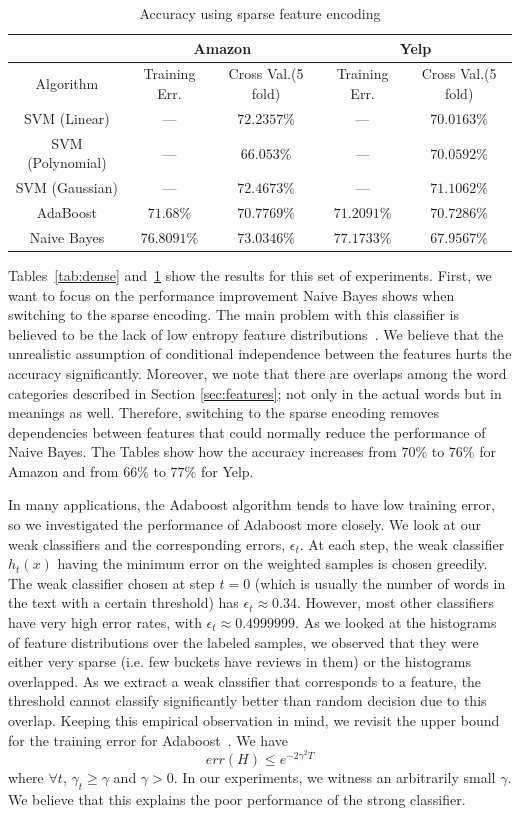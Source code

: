 \documentclass[letterpaper]{article}
\begin{document}
\begin{table}[ht]
\centering
\begin{tabular}{c | c c | c c}
 & \multicolumn{2}{|c|}{Amazon} & \multicolumn{2}{|c}{Yelp} \\
\hline
Algorithm & Training Err. & Cross Val.(5 fold) & Training Err. & Cross Val.(5 fold)\\
\hline
SVM (Linear) 		& --- & $72.2357\%$ 		& --- & $70.0163\%$\\
SVM (Polynomial) 	& --- & $66.053\%$ 		& --- & $70.0592\%$\\
SVM (Gaussian) 		& --- & $72.4673\%$ 		& --- & $71.1062\%$\\
AdaBoost 			& $71.68\%$   & $70.7769\%$ & $71.2091\%$ & $70.7286\%$\\ 
Naive Bayes 		& $76.8091\%$ & $73.0346\%$ & $77.1733\%$ & $67.9567\%$\\ 
\end{tabular}
\caption{Accuracy using sparse feature encoding}
\label{tab:sparse}
\end{table}

Tables~\ref{tab:dense} and~\ref{tab:sparse} show the results for this
set of experiments. First, we want to focus on the performance
improvement Naive Bayes shows when switching to the sparse encoding. The main 
problem with this classifier is believed to be the lack of low entropy feature
distributions~\cite{naivebayes}. We believe that the unrealistic
assumption of conditional independence between the features hurts the
accuracy significantly. Moreover, we note that there are overlaps
among the word categories described in Section \ref{sec:features}; not only 
in the actual words but in meanings as well. Therefore, switching to the sparse 
encoding removes dependencies between features that could normally reduce the
performance of Naive Bayes. The Tables show how the accuracy increases
from $70\%$ to $76\%$ for Amazon and from $66\%$ to $77\%$ for Yelp.

In many applications, the Adaboost algorithm tends to have low training
error, so we investigated the performance of Adaboost more closely. We
look at our weak classifiers and the corresponding errors,
$\epsilon_t$. At each step, the weak classifier $h_t(x)$ having the
minimum error on the weighted samples is chosen greedily. The 
weak classifier chosen at step $t=0$ (which is usually the number of words 
in the text with a certain threshold) has $\epsilon_t \approx 0.34$. However,
most other classifiers have very high error rates, with $\epsilon_t \approx
0.4999999$. As we looked at the histograms of feature distributions over the 
labeled samples, we observed that they were either very sparse (i.e. few
buckets have reviews in them) or the histograms overlapped. As we
extract a weak classifier that corresponds to a feature, the threshold
cannot classify significantly better than random decision due to this
overlap. Keeping this empirical observation in mind, we revisit the
upper bound for the training error for
Adaboost~\cite{adaboost,adaboost2}. We have
\[
err(H) \leq e^{-2\gamma^2 T}
\]
where $\forall t$, $\gamma_t \geq \gamma $ and $\gamma > 0$. In our
experiments, we witness an arbitrarily small $\gamma$. We believe that
this explains the poor performance of the strong classifier.
\end{document}
